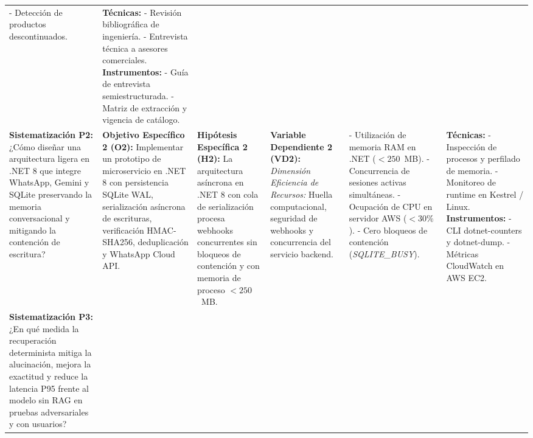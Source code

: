 \begin{landscape}
\begin{table}[H]
\begin{tabular}{p{3.8cm} p{3.8cm} p{3.8cm} p{3.0cm} p{3.0cm} p{3.0cm}}
- Detección de productos descontinuados. &
\textbf{Técnicas:} \newline
- Revisión bibliográfica de ingeniería. \newline
- Entrevista técnica a asesores comerciales. \newline
\textbf{Instrumentos:} \newline
- Guía de entrevista semiestructurada. \newline
- Matriz de extracción y vigencia de catálogo. \\
\addlinespace[2pt]
\textbf{Sistematización P2:} \newline
¿Cómo diseñar una arquitectura ligera en .NET 8 que integre WhatsApp, Gemini y SQLite preservando la memoria conversacional y mitigando la contención de escritura? &
\textbf{Objetivo Específico 2 (O2):} \newline
Implementar un prototipo de microservicio en .NET 8 con persistencia SQLite WAL, serialización asíncrona de escrituras, verificación HMAC-SHA256, deduplicación y WhatsApp Cloud API. &
\textbf{Hipótesis Específica 2 (H2):} \newline
La arquitectura asíncrona en .NET 8 con cola de serialización procesa webhooks concurrentes sin bloqueos de contención y con memoria de proceso $< 250$~MB. &
\textbf{Variable Dependiente 2 (VD2):} \newline
\textit{Dimensión Eficiencia de Recursos:} \newline
Huella computacional, seguridad de webhooks y concurrencia del servicio backend. &
- Utilización de memoria RAM en .NET ($< 250$~MB). \newline
- Concurrencia de sesiones activas simultáneas. \newline
- Ocupación de CPU en servidor AWS ($< 30\%$). \newline
- Cero bloqueos de contención (\textit{SQLITE\_BUSY}). &
\textbf{Técnicas:} \newline
- Inspección de procesos y perfilado de memoria. \newline
- Monitoreo de runtime en Kestrel / Linux. \newline
\textbf{Instrumentos:} \newline
- CLI dotnet-counters y dotnet-dump. \newline
- Métricas CloudWatch en AWS EC2. \\
\addlinespace[2pt]
\textbf{Sistematización P3:} \newline
¿En qué medida la recuperación determinista mitiga la alucinación, mejora la exactitud y reduce la latencia P95 frente al modelo sin RAG en pruebas adversariales y con usuarios? &

\end{tabular}
\end{table}
\end{landscape}
